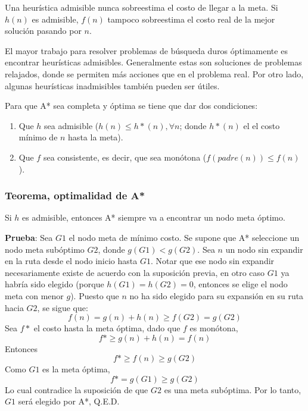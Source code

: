 Una heurística admisible nunca sobreestima el costo de llegar a la meta. Si
$h(n)$ es admisible, $f(n)$ tampoco sobreestima el costo real de la mejor
solución pasando por $n$.

El mayor trabajo para resolver problemas de búsqueda duros óptimamente es
encontrar heurísticas admisibles. Generalmente estas son soluciones de problemas
relajados, donde se permiten más acciones que en el problema real. Por otro
lado, algunas heurísticas inadmisibles también pueden ser útiles.

Para que A* sea completa y óptima se tiene que dar dos condiciones:
\begin{enumerate}
    \item Que $h$ sea admisible ($h(n) \leq h*(n), \forall n$; donde $h*(n)$ el
    el costo mínimo de $n$ hasta la meta).
    \item Que $f$ sea consistente, es decir, que sea monótona
    ($f(padre(n)) \leq f(n)$).
\end{enumerate}

\subsubsection{Teorema, optimalidad de A*}
Si $h$ es admisible, entonces A* siempre va a encontrar un nodo meta óptimo.

\textbf{Prueba}: Sea $G1$ el nodo meta de mínimo costo. Se supone que A*
seleccione un nodo meta subóptimo $G2$, donde $g(G1) < g(G2)$. Sea $n$ un nodo
sin expandir en la ruta desde el nodo inicio hasta $G1$. Notar que ese nodo sin
expandir necesariamente existe de acuerdo con la suposición previa, en otro
caso $G1$ ya habría sido elegido (porque $h(G1) = h(G2) = 0$, entonces se elige
el nodo meta con menor $g$). Puesto que $n$ no ha sido elegido para su expansión
en su ruta hacia $G2$, se sigue que:
$$ f(n) = g(n) + h(n) \geq f(G2) = g(G2) $$
Sea $f*$ el costo hasta la meta óptima, dado que $f$ es monótona,
$$ f* \geq g(n) + h(n) = f(n) $$
Entonces
$$ f* \geq f(n) \geq g(G2) $$
Como $G1$ es la meta óptima,
$$ f* = g(G1) \geq g(G2) $$
Lo cual contradice la suposición de que $G2$ es una meta subóptima. Por lo tanto,
$G1$ será elegido por A*, Q.E.D.

